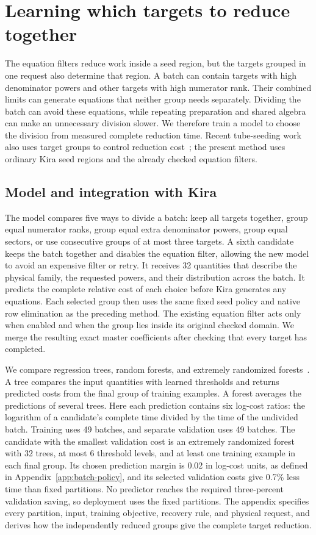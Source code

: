 \section{Learning which targets to reduce together}
\label{sec:batch-policy}
The equation filters reduce work inside a seed region, but the targets grouped in one request also determine that region. A batch can contain targets with high denominator powers and other targets with high numerator rank. Their combined limits can generate equations that neither group needs separately. Dividing the batch can avoid these equations, while repeating preparation and shared algebra can make an unnecessary division slower. We therefore train a model to choose the division from measured complete reduction time. Recent tube-seeding work also uses target groups to control reduction cost~\cite{TubeSeeding2026}; the present method uses ordinary Kira seed regions and the already checked equation filters.

\subsection{Model and integration with Kira}
The model compares five ways to divide a batch: keep all targets together, group equal numerator ranks, group equal extra denominator powers, group equal sectors, or use consecutive groups of at most three targets. A sixth candidate keeps the batch together and disables the equation filter, allowing the new model to avoid an expensive filter or retry. It receives 32 quantities that describe the physical family, the requested powers, and their distribution across the batch. It predicts the complete relative cost of each choice before Kira generates any equations. Each selected group then uses the same fixed seed policy and native row elimination as the preceding method. The existing equation filter acts only when enabled and when the group lies inside its original checked domain. We merge the resulting exact master coefficients after checking that every target has completed.

We compare regression trees, random forests, and extremely randomized forests~\cite{CART1984,Breiman2001Forest,Geurts2006ExtraTrees}. A tree compares the input quantities with learned thresholds and returns predicted costs from the final group of training examples. A forest averages the predictions of several trees. Here each prediction contains six log-cost ratios: the logarithm of a candidate's complete time divided by the time of the undivided batch. Training uses 49 batches, and separate validation uses 49 batches. The candidate with the smallest validation cost is an extremely randomized forest with 32 trees, at most 6 threshold levels, and at least one training example in each final group. Its chosen prediction margin is 0.02 in log-cost units, as defined in Appendix~\ref{app:batch-policy}, and its selected validation costs give 0.7\% less time than fixed partitions. No predictor reaches the required three-percent validation saving, so deployment uses the fixed partitions. The appendix specifies every partition, input, training objective, recovery rule, and physical request, and derives how the independently reduced groups give the complete target reduction.

